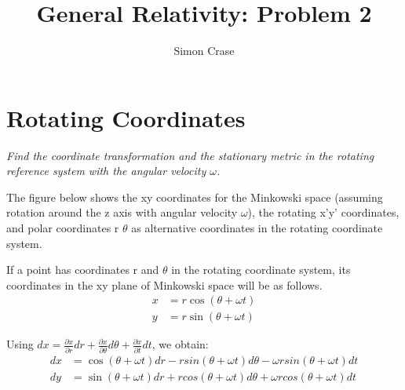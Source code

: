 \documentclass[11pt,a4paper]{article}
\author{Simon Crase}
\title{General Relativity: Problem 2}
\begin{document}
\maketitle


\section{Rotating Coordinates}

\textit{Find the coordinate transformation and the stationary metric in the rotating reference system with the angular velocity $\omega$.}	

The figure below shows the xy coordinates for the Minkowski space (assuming rotation around the z axis with angular velocity $\omega$), the rotating x'y' coordinates, and polar coordinates r $\theta$ as alternative coordinates in the rotating coordinate system.


If a point has coordinates r and $\theta$ in the rotating coordinate system, its coordinates in the xy plane of Minkowski space will be as follows.
\begin{subequations}
	\begin{align}
	x &= r \cos(\theta+\omega t)\\
	y &= r \sin(\theta+\omega t)
	\end{align}
\end{subequations}

Using $dx = \frac{\partial x}{\partial r} dr + \frac{\partial x}{\partial \theta} d \theta + \frac{\partial x}{\partial t} dt$, we obtain:
\begin{subequations}
	\begin{align}
	dx &= \cos(\theta + \omega t) dr -r sin(\theta + \omega t) d\theta - \omega r sin(\theta + \omega t) dt\\
	dy &= \sin(\theta + \omega t) dr + r cos(\theta + \omega t) d\theta + \omega r cos(\theta + \omega t) dt
	\end{align}
\end{subequations}
\end{document}
